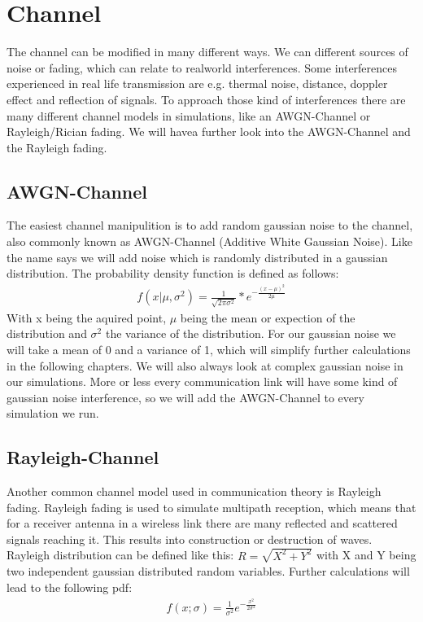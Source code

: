 \documentclass[12pt,oneside, reqno]{report}
\begin{document}
\section{Channel}
The channel can be modified in many different ways. We can different sources of noise or fading, which can relate to realworld interferences. Some interferences experienced in real life transmission are e.g. thermal noise, distance, doppler effect and reflection of signals. To approach those kind of interferences there are many different channel models in simulations, like an AWGN-Channel or Rayleigh/Rician fading. We will havea further look into the AWGN-Channel and the Rayleigh fading.

\subsection{AWGN-Channel}
The easiest channel manipulition is to add random gaussian noise to the channel, also commonly known as AWGN-Channel (Additive White Gaussian Noise). Like the name says we will add noise which is randomly distributed in a gaussian distribution. The probability density function is defined as follows:
\begin{gather*}
f(x|\mu,\sigma^2) = \frac{1}{\sqrt{2\pi\sigma^2}}*e^{-\frac{(x-\mu)^2}{2\mu}}
\end{gather*}
With x being the aquired point, $\mu$ being the mean or expection of the distribution and $\sigma^2$ the variance of the distribution. For our gaussian noise we will take a mean of 0 and a variance of 1, which will simplify further calculations in the following chapters. We will also always look at complex gaussian noise in our simulations. More or less every communication link will have some kind of gaussian noise interference, so we will add the AWGN-Channel to every simulation we run.

\subsection{Rayleigh-Channel}
Another common channel model used in communication theory is Rayleigh fading. Rayleigh fading is used to simulate multipath reception, which means that for a receiver antenna in a wireless link there are many reflected and scattered signals reaching it. This results into construction or destruction of waves. Rayleigh distribution can be defined like this: $R = \sqrt{X^2 + Y^2}$ with X and Y being two independent gaussian distributed random variables. Further calculations will lead to the following pdf:
\begin{gather*}
f(x;\sigma) = \frac{1}{\sigma^2}e^{-\frac{x^2}{2\sigma^2}} 
\end{gather*} 
\end{document}
